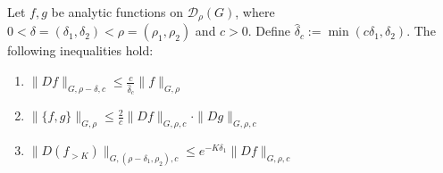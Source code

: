\begin{lemma}\label{lemma:1.1}
Let $f,g$ be analytic functions on $\mathcal{D}_\rho(G)$, where
$0<\delta = (\delta_1, \delta_2) < \rho = (\rho_1, \rho_2)$ and $c > 0$.
Define $\hat\delta_c := \min(c\delta_1, \delta_2)$. The following inequalities hold:
\begin{enumerate}
\item $\|Df\|_{G,\rho- \delta,c} \leq \frac{c}{\hat\delta_c}\|f\|_{G,\rho}$
\item $\|\{f,g\}\|_{G,\rho}\leq \frac{2}{c}\|Df\|_{G,\rho, c}\cdot \|D g\|_{G, \rho,c}$
\item $\|D(f_{>K})\|_{G, (\rho-\delta_1, \rho_2),c} \leq e^{-K\delta_1}\|Df\|_{G,\rho, c}$
\end{enumerate}
\end{lemma}

